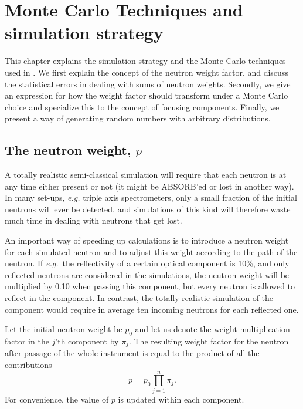 
\chapter{Monte Carlo Techniques and simulation strategy}
\label{s:MCtechniques}

This chapter explains the simulation strategy and the Monte Carlo
techniques used in \MCS. We first explain the concept of the neutron
weight factor, and discuss the statistical errors in dealing with sums
of neutron weights.  Secondly, we give an expression for how the weight
factor should transform under a Monte Carlo choice and specialize this
to the concept of focusing components.  Finally, we present a way of
generating random numbers with arbitrary distributions.

\section{The neutron weight, $p$}
\label{s:probweight}
A totally realistic semi-classical simulation will require that
each neutron is at any time either present or not
(it might be ABSORB'ed or lost in another way).
In many set-ups, {\em e.g.} triple axis spectrometers, only a
small fraction of the initial neutrons will ever be detected, and
simulations of this kind will therefore waste much time in dealing
with neutrons that get lost.

An important way of speeding up calculations is to introduce
a neutron weight for each simulated neutron and to
adjust this weight according to the path of the neutron.
If {\em e.g.}\ the reflectivity of a certain 
optical component is 10\%, and only reflected neutrons are
considered in the simulations, the neutron
weight will be multiplied by 0.10 when passing this component,
but every neutron is allowed to reflect in the component.
In contrast, the totally realistic simulation of the component
would require in average ten incoming neutrons for each reflected one.

Let the initial neutron weight be $p_0$ and let us denote the weight
multiplication factor in the $j$'th component by $\pi_j$.  The resulting
weight factor for the neutron after passage of the whole instrument is 
equal to the product of all the contributions
\begin{equation}
\label{e:probprod}
p = p_0 \prod_{j=1}^n \pi_j .
\end{equation}
For convenience, the value of $p$ is updated within each component.

